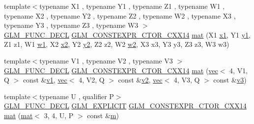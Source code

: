 \begin{DoxyCompactItemize}
{\footnotesize template$<$typename X1 , typename Y1 , typename Z1 , typename W1 , typename X2 , typename Y2 , typename Z2 , typename W2 , typename X3 , typename Y3 , typename Z3 , typename W3 $>$ }\\\hyperlink{setup_8hpp_ab2d052de21a70539923e9bcbf6e83a51}{G\+L\+M\+\_\+\+F\+U\+N\+C\+\_\+\+D\+E\+CL} \hyperlink{setup_8hpp_a0900f9145e68bf6061b6f5e7be3fa751}{G\+L\+M\+\_\+\+C\+O\+N\+S\+T\+E\+X\+P\+R\+\_\+\+C\+T\+O\+R\+\_\+\+C\+X\+X14} \hyperlink{structglm_1_1mat_3_013_00_014_00_01_t_00_01_q_01_4_a789aeb16a52b123e18e519b41ecfc4f3}{mat} (X1 \hyperlink{_s_d_l__opengl__glext_8h_a49825216c96caaeb09237b36651181c5}{x1}, Y1 \hyperlink{_s_d_l__opengl__glext_8h_a3af6c78fcdfccea028a5878bc747ef39}{y1}, Z1 z1, W1 \hyperlink{_s_d_l__opengl__glext_8h_ab5b747bf5adb1f9134337c30b9a4ce84}{w1}, X2 \hyperlink{_s_d_l__opengl__glext_8h_a7b907a03236685c534d89d604cff23c8}{x2}, Y2 \hyperlink{_s_d_l__opengl__glext_8h_a2be1135ed68e8d80fa9e130c7814f8c2}{y2}, Z2 z2, W2 \hyperlink{_s_d_l__opengl__glext_8h_a1ca5aca787be24213d9591fdf074b094}{w2}, X3 x3, Y3 y3, Z3 z3, W3 w3)
\item 
{\footnotesize template$<$typename V1 , typename V2 , typename V3 $>$ }\\\hyperlink{setup_8hpp_ab2d052de21a70539923e9bcbf6e83a51}{G\+L\+M\+\_\+\+F\+U\+N\+C\+\_\+\+D\+E\+CL} \hyperlink{setup_8hpp_a0900f9145e68bf6061b6f5e7be3fa751}{G\+L\+M\+\_\+\+C\+O\+N\+S\+T\+E\+X\+P\+R\+\_\+\+C\+T\+O\+R\+\_\+\+C\+X\+X14} \hyperlink{structglm_1_1mat_3_013_00_014_00_01_t_00_01_q_01_4_a135092220b6453ee15896a05b01fcbd6}{mat} (\hyperlink{structglm_1_1vec}{vec}$<$ 4, V1, Q $>$ const \&\hyperlink{_s_d_l__opengl__glext_8h_a435c176a02c061b43e19bdf7c86cceae}{v1}, \hyperlink{structglm_1_1vec}{vec}$<$ 4, V2, Q $>$ const \&\hyperlink{_s_d_l__opengl__glext_8h_a0928f6d0f0f794ba000a21dfae422136}{v2}, \hyperlink{structglm_1_1vec}{vec}$<$ 4, V3, Q $>$ const \&\hyperlink{_s_d_l__opengl__glext_8h_acc806b31cbf466ceba6555983d8b814d}{v3})
\item 
{\footnotesize template$<$typename U , qualifier P$>$ }\\\hyperlink{setup_8hpp_ab2d052de21a70539923e9bcbf6e83a51}{G\+L\+M\+\_\+\+F\+U\+N\+C\+\_\+\+D\+E\+CL} \hyperlink{setup_8hpp_a6c74f5a5e7b134ab69023ff9a30d4d5d}{G\+L\+M\+\_\+\+E\+X\+P\+L\+I\+C\+IT} \hyperlink{setup_8hpp_a0900f9145e68bf6061b6f5e7be3fa751}{G\+L\+M\+\_\+\+C\+O\+N\+S\+T\+E\+X\+P\+R\+\_\+\+C\+T\+O\+R\+\_\+\+C\+X\+X14} \hyperlink{structglm_1_1mat_3_013_00_014_00_01_t_00_01_q_01_4_ab07fea76c961a22e1aa486f9276f2d75}{mat} (\hyperlink{structglm_1_1mat}{mat}$<$ 3, 4, U, P $>$ const \&\hyperlink{_s_d_l__opengl__glext_8h_af593500c283bf1a787a6f947f503a5c2}{m})

\end{DoxyCompactItemize}
